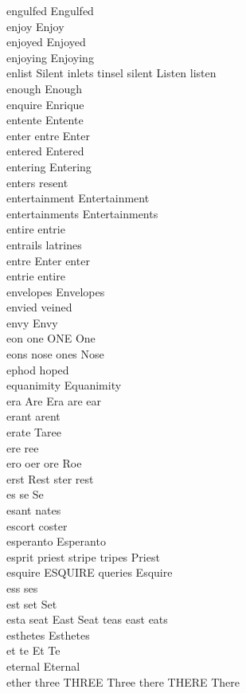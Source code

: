engulfed Engulfed\\
enjoy Enjoy\\
enjoyed Enjoyed\\
enjoying Enjoying\\
enlist Silent inlets tinsel silent Listen listen\\
enough Enough\\
enquire Enrique\\
entente Entente\\
enter entre Enter\\
entered Entered\\
entering Entering\\
enters resent\\
entertainment Entertainment\\
entertainments Entertainments\\
entire entrie\\
entrails latrines\\
entre Enter enter\\
entrie entire\\
envelopes Envelopes\\
envied veined\\
envy Envy\\
eon one ONE One\\
eons nose ones Nose\\
ephod hoped\\
equanimity Equanimity\\
era Are Era are ear\\
erant arent\\
erate Taree\\
ere ree\\
ero oer ore Roe\\
erst Rest ster rest\\
es se Se\\
esant nates\\
escort coster\\
esperanto Esperanto\\
esprit priest stripe tripes Priest\\
esquire ESQUIRE queries Esquire\\
ess ses\\
est set Set\\
esta seat East Seat teas east eats\\
esthetes Esthetes\\
et te Et Te\\
eternal Eternal\\
ether three THREE Three there THERE There\\
